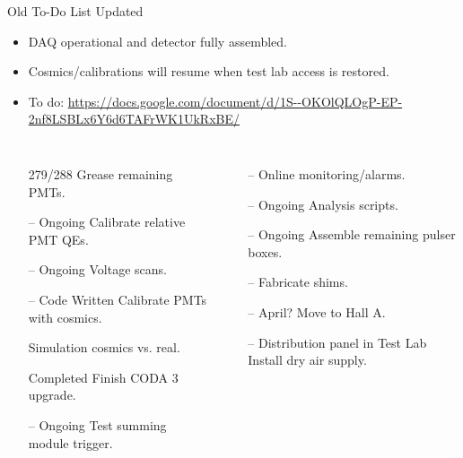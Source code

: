 \documentclass[10pt]{beamer}
\begin{document}
\begin{frame}{Old To-Do List Updated}

	\begin{itemize}
		\item {}\alert{DAQ operational and detector fully assembled.}
		\item {}\alert{Cosmics/calibrations will resume when test lab access is restored.}
		\item {}\alert{To do:} \url{https://docs.google.com/document/d/1S--OKOlQLOgP-EP-2nf8LSBLx6Y6d6TAFrWK1UkRxBE/}
	\end{itemize}
	
	\begin{columns}[T,onlytextwidth]

			\begin{itemize}\itemsep0pt \parskip0pt 
				\item[\checkmark] \footnotesize{\alert{279/288} Grease remaining PMTs.}
				\item[--] \footnotesize{\alert{Ongoing} Calibrate relative PMT QEs.}
				\item[--] \footnotesize{\alert{Ongoing} Voltage scans.}
				\item[--] \footnotesize{\alert{Code Written} Calibrate PMTs with cosmics.}
				\item[\checkmark] Simulation cosmics vs. real.
				\item[\checkmark] \footnotesize{\alert{Completed} Finish CODA 3 upgrade.}
				\item[--] \footnotesize{\alert{Ongoing} Test summing module trigger.}	
			\end{itemize}
				
			\begin{itemize}\itemsep0pt \parskip0pt 
				\item[--] \footnotesize{Online monitoring/alarms.}
				\item[--] \footnotesize{\alert{Ongoing} Analysis scripts.}
				\item[--] \footnotesize{\alert{Ongoing} Assemble remaining pulser boxes.}
				\item[--] \footnotesize{Fabricate shims.}
				\item[--] \footnotesize{\alert{April?} Move to Hall A.}
				\item[--] \footnotesize{\alert{Distribution panel in Test Lab} Install dry air supply.}
			\end{itemize}
			\end{columns}
				

\end{frame}
\end{document}
